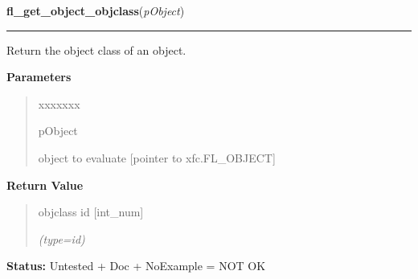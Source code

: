 \hspace{.8\funcindent}\begin{boxedminipage}{\funcwidth}

    \raggedright \textbf{fl\_get\_object\_objclass}(\textit{pObject})

    \vspace{-1.5ex}

    \rule{\textwidth}{0.5\fboxrule}
\setlength{\parskip}{2ex}
    Return the object class of an object.

\setlength{\parskip}{1ex}
      \textbf{Parameters}
      \vspace{-1ex}

      \begin{quote}
        \begin{Ventry}{xxxxxxx}

          \item[pObject]

          object to evaluate [pointer to xfc.FL\_OBJECT]

        \end{Ventry}

      \end{quote}

      \textbf{Return Value}
    \vspace{-1ex}

      \begin{quote}
      objclass id [int\_num]

      {\it (type=id)}

      \end{quote}

\textbf{Status:} Untested + Doc + NoExample = NOT OK



    \end{boxedminipage}

    \label{xformslib:library:fl_get_object_type}

    \vspace{0.5ex}

